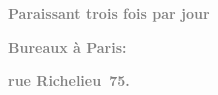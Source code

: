 \pstart
           \begin{otherlanguage}{french}\textcolor{gray}{\textbf{\textbf{Paraissant trois fois par jour}}}\end{otherlanguage}\pend
           
\pstart
           \begin{otherlanguage}{french}\textcolor{gray}{\textbf{\textbf{Bureaux à Paris:}}}\end{otherlanguage}\pend
           
\pstart
           \begin{otherlanguage}{french}\textcolor{gray}{\textbf{\textbf{rue Richelieu 75.}}}\end{otherlanguage}\pend
           
